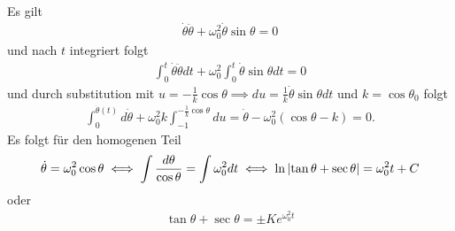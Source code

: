 \documentclass[ngerman]{report}
\begin{document}
\begin{answer}
    Es gilt 
    \begin{align*}
        \dot{\theta}\ddot\theta + \omega^2_0 \dot\theta \sin\theta = 0 
    \end{align*}
    und nach $t$ integriert folgt
    \begin{align*}
        \int_0^t \dot\theta \ddot\theta dt  + \omega^2_0  \int_0^t\dot\theta \sin\theta dt = 0
    \end{align*}
    und durch substitution mit $u = -\frac{1}{k}\cos\theta \implies du = \frac{1}{k}\dot\theta \sin\theta dt$ und $k = \cos\theta_0$ folgt
    \begin{align*}
        \int_0^{\dot\theta(t)} d\dot\theta + \omega^2_0 k\int_{-1}^{-\frac{1}{k}\cos\theta} du= \dot\theta-\omega^2_0 (\cos\theta -k) = 0.
    \end{align*}
    Es folgt für den homogenen Teil
    \begin{align*}
        \dot\theta = \omega_0^2 \cos\theta \iff \int \frac{d\theta}{\cos\theta} = \int \omega_0^2 dt \iff \ln\left|\tan \theta+\sec \theta\right| = \omega_0^2 t + C
    \end{align*}
    oder
    \begin{align*}
        \tan \theta + \sec \theta = \pm K e^{\omega_0^2 t}
    \end{align*}
\end{answer}
\end{document}
